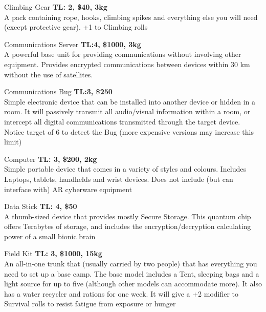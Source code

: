 \begin{genericsection}{Climbing Gear}
\textbf{TL: 2, \$40, 3kg}\\
A pack containing rope, hooks, climbing spikes and everything else you will need (except protective gear). +1 to Climbing rolls
\end{genericsection}

\begin{genericsection}{Communications Server}
\textbf{TL:4, \$1000, 3kg}\\
A powerful base unit for providing communications without involving other equipment. Provides encrypted communications between devices within 30 km without the use of satellites.
\end{genericsection}

\begin{genericsection}{Communications Bug}
\textbf{TL:3, \$250}\\
Simple electronic device that can be installed into another device or hidden in a room. It will passively transmit all audio/visual information within a room, or intercept all digital communications transmitted through the target device. Notice target of 6 to detect the Bug (more expensive versions may increase this limit)
\end{genericsection}

\begin{genericsection}{Computer}
\textbf{TL: 3, \$200, 2kg}\\
Simple portable device that comes in a variety of styles and colours. Includes Laptops, tablets, handhelds and wrist devices. Does not include (but can interface with) AR cyberware equipment
\end{genericsection}

\begin{genericsection}{Data Stick}
\textbf{TL: 4, \$50}\\
A thumb-sized device that provides mostly Secure Storage. This quantum chip offers Terabytes of storage, and includes the encryption/decryption calculating power of a small bionic brain
\end{genericsection}

\begin{genericsection}{Field Kit}
\textbf{TL: 3, \$1000, 15kg}\\
An all-in-one trunk that (usually carried by two people) that has everything you need to set up a base camp. The base model includes a Tent, sleeping bags and a light source for up to five (although other models can accommodate more). It also has a water recycler and rations for one week. It will give a +2 modifier to Survival rolls to resist fatigue from exposure or hunger
\end{genericsection}

